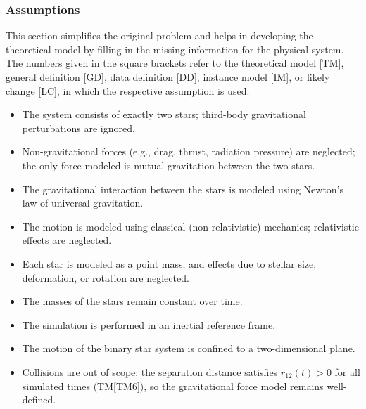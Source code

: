 \documentclass[12pt]{article}
\newcommand{\tref}[1]{TM\ref{#1}}
\newcounter{assumpnum} %
\begin{document}
\subsubsection{Assumptions} \label{sec_assumpt}

This section simplifies the original problem and helps in developing the
theoretical model by filling in the missing information for the physical system.
The numbers given in the square brackets refer to the theoretical model [TM],
general definition [GD], data definition [DD], instance model [IM], or likely
change [LC], in which the respective assumption is used.

\begin{itemize}

\item[A\refstepcounter{assumpnum}\theassumpnum \label{A_twoBody}:]
The system consists of exactly two stars; third-body gravitational perturbations
are ignored.

\item[A\refstepcounter{assumpnum}\theassumpnum \label{A_isolated}:]
Non-gravitational forces (e.g., drag, thrust, radiation pressure) are neglected;
the only force modeled is mutual gravitation between the two stars.

\item[A\refstepcounter{assumpnum}\theassumpnum \label{A_newtonianGravity}:]
The gravitational interaction between the stars is modeled using Newton's law of
universal gravitation.

\item[A\refstepcounter{assumpnum}\theassumpnum \label{A_nonRelativistic}:]
The motion is modeled using classical (non-relativistic) mechanics; relativistic
effects are neglected.

\item[A\refstepcounter{assumpnum}\theassumpnum \label{A_pointMass}:]
Each star is modeled as a point mass, and effects due to stellar size,
deformation, or rotation are neglected.

\item[A\refstepcounter{assumpnum}\theassumpnum \label{A_constantMass}:]
The masses of the stars remain constant over time.

\item[A\refstepcounter{assumpnum}\theassumpnum \label{A_inertialFrame}:]
The simulation is performed in an inertial reference frame.

\item[A\refstepcounter{assumpnum}\theassumpnum \label{A_planar}:]
The motion of the binary star system is confined to a two-dimensional plane.

\item[A\refstepcounter{assumpnum}\theassumpnum \label{A_nonzeroSeparation}:]
Collisions are out of scope: the separation distance satisfies $r_{12}(t) > 0$
for all simulated times (\tref{TM6}), so the gravitational force model remains
well-defined.

\end{itemize}
\end{document}
